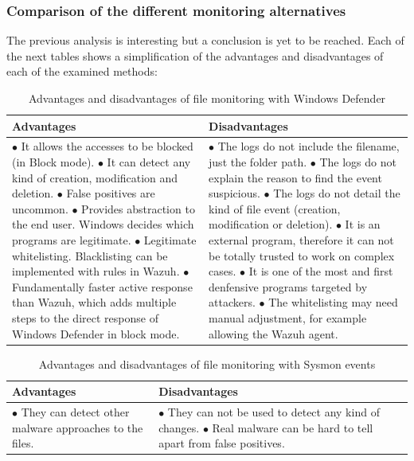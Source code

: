 \subsubsection{Comparison of the different monitoring alternatives}
The previous analysis is interesting but a conclusion is yet to be reached.
Each of the next tables shows a simplification of the advantages and disadvantages of each of the examined methods:
\begin{table}[H]
	\begin{tabularx}{\textwidth}{|w|w|}
		\hline
		Advantages & Disadvantages\\ \hline
			$\bullet$ It allows the accesses to be blocked (in Block mode).
			\linej $\bullet$ It can detect any kind of creation, modification and deletion.
			\linej $\bullet$ False positives are uncommon.
			\linej $\bullet$ Provides abstraction to the end user. Windows decides which programs are legitimate.
			\linej $\bullet$ Legitimate whitelisting. Blacklisting can be implemented with rules in Wazuh.
			\linej $\bullet$ Fundamentally faster active response than Wazuh, which adds multiple steps to the direct response of Windows Defender in block mode.
		&
			$\bullet$ The logs do not include the filename, just the folder path.
			\linej $\bullet$ The logs do not explain the reason to find the event suspicious.
			\linej $\bullet$ The logs do not detail the kind of file event (creation, modification or deletion).
			\linej $\bullet$ It is an external program, therefore it can not be totally trusted to work on complex cases.
			\linej $\bullet$ It is one of the most and first denfensive programs targeted by attackers.
			\linej $\bullet$ The whitelisting may need manual adjustment, for example allowing the Wazuh agent.
			\\ \hline
	\end{tabularx}
	\caption{Advantages and disadvantages of file monitoring with Windows Defender}
\end{table}

\begin{table}[H]
	\begin{tabularx}{\textwidth}{|w|w|}
		\hline
		Advantages & Disadvantages\\ \hline
			$\bullet$ They can detect other malware approaches to the files.
		&
			$\bullet$ They can not be used to detect any kind of changes.
			\linej $\bullet$ Real malware can be hard to tell apart from false positives.
			\\ \hline
	\end{tabularx}
	\caption{Advantages and disadvantages of file monitoring with Sysmon events}
\end{table}

